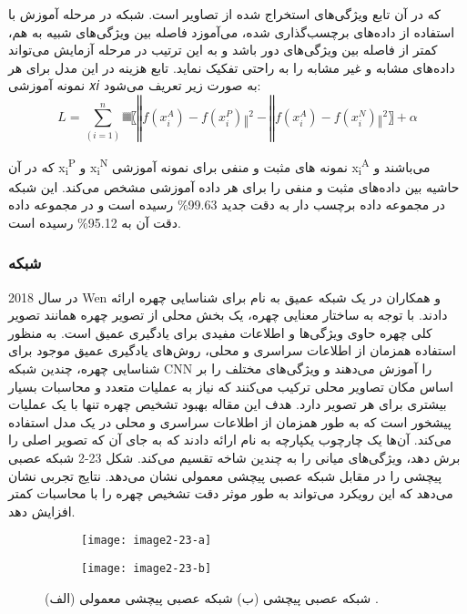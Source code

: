 \noindent
که در آن تابع  ویژگی‌های استخراج شده از تصاویر است. شبكه در مرحله آموزش با استفاده از داده‌های برچسب‌گذاری شده، می‌آموزد فاصله بین ویژگی‌های شبیه به هم، کمتر از فاصله بین ویژگی‌های دور باشد و به این ترتیب در مرحله آزمایش می‌تواند داده‌های مشابه و غیر مشابه را به راحتی تفكیک نماید. تابع هزینه در این مدل برای هر نمونه آموزشی 𝑥𝑖  به صورت زیر تعریف می‌شود:
\begin{equation}\label{eq2-11}
L=∑_(i=1)^n▒〖‖f(x_i^A )-f(x_i^P)‖^2-‖f(x_i^A )-f(x_i^N)‖^2 〗+α	
\end{equation}

\noindent
که در آن
x\textsubscript{i}\textsuperscript{P}   
و
x\textsubscript{i}\textsuperscript{N}   
نمونه های مثبت و منفی برای نمونه آموزشی
x\textsubscript{i}\textsuperscript{A}
می‌باشند و  حاشیه بین داده‌های مثبت و منفی را برای هر داده آموزشی مشخص می‌کند. این شبکه در مجموعه داده برچسب دار  به دقت جدید 99.63\% رسیده است و در مجموعه داده
دقت آن به 95.12\% رسیده است.
	
\subsubsection{	شبکه }
در سال 2018 Wen و همکاران در \cite{WEN201894} یک شبکه عمیق به نام  برای شناسایی چهره ارائه دادند. با توجه به ساختار معنایی چهره، یک بخش محلی از تصویر چهره همانند تصویر کلی چهره حاوی ویژگی‌ها و اطلاعات مفیدی برای یادگیری عمیق است. به منظور استفاده همزمان از اطلاعات سراسری و محلی، روش‌های یادگیری عمیق موجود برای شناسایی چهره، چندین شبکه CNN را آموزش می‌دهند و ویژگی‌های مختلف را بر اساس مکان تصاویر محلی ترکیب می‌کنند که نیاز به عملیات متعدد و محاسبات بسیار بیشتری برای هر تصویر دارد. هدف این مقاله بهبود تشخیص چهره تنها با یک عملیات پیشخور  است که به طور همزمان از اطلاعات سراسری و محلی در یک مدل استفاده می‌کند. آن‌ها یک چارچوب یکپارچه به نام  ارائه دادند که به جای آن که تصویر اصلی را برش دهد، ویژگی‌های میانی را به چندین شاخه تقسیم می‌کند. شکل ‏2-23 شبکه عصبی پیچشی  را در مقابل شبکه عصبی پیچشی معمولی نشان می‌دهد. نتایج تجربی نشان می‌دهد که این رویکرد می‌تواند به طور موثر دقت تشخیص چهره را با محاسبات کمتر افزایش دهد. 
 	 
\begin{figure}
\begin{subfigure}{.5\textwidth}
  \centering
  \texttt{[image: image2-23-a]}
  \label{image2-23-a}
\end{subfigure}
\begin{subfigure}{.5\textwidth}
  \centering
  \texttt{[image: image2-23-b]}
  \label{image2-23-b}
\end{subfigure}
  \caption{ (الف) شبکه عصبی پیچشی   (ب) شبکه عصبی پیچشی معمولی \cite{ref1}.}
\label{fig:image2-23}
\end{figure}

